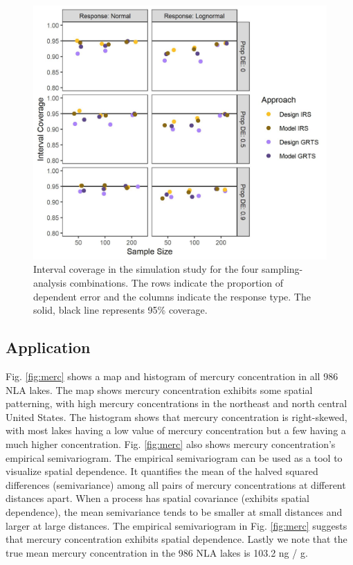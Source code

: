 \documentclass[]{elsarticle} %
\begin{document}
\begin{figure}
  \centering
  \includegraphics[width = 1\linewidth]{figures/coverage.jpeg}
  \caption{Interval coverage in the simulation study for the four sampling-analysis combinations. The rows indicate the proportion of dependent error and the columns indicate the response type. The solid, black line represents 95\% coverage.}
  \label{fig:figconf}
\end{figure}

\hypertarget{sec:r_app}{%
\subsection{Application}\label{sec:r_app}}

Fig. \ref{fig:merc} shows a map and histogram of mercury concentration
in all 986 NLA lakes. The map shows mercury concentration exhibits some
spatial patterning, with high mercury concentrations in the northeast
and north central United States. The histogram shows that mercury
concentration is right-skewed, with most lakes having a low value of
mercury concentration but a few having a much higher concentration. Fig.
\ref{fig:merc} also shows mercury concentration's empirical
semivariogram. The empirical semivariogram can be used as a tool to
visualize spatial dependence. It quantifies the mean of the halved
squared differences (semivariance) among all pairs of mercury
concentrations at different distances apart. When a process has spatial
covariance (exhibits spatial dependence), the mean semivariance tends to
be smaller at small distances and larger at large distances. The
empirical semivariogram in Fig. \ref{fig:merc} suggests that mercury
concentration exhibits spatial dependence. Lastly we note that the true
mean mercury concentration in the 986 NLA lakes is 103.2 ng / g.
\end{document}
